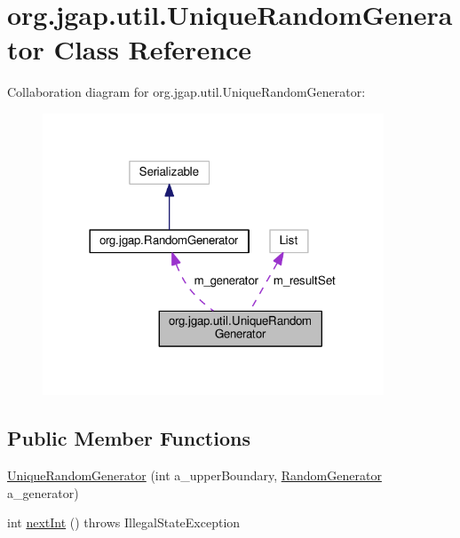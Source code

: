 \hypertarget{classorg_1_1jgap_1_1util_1_1_unique_random_generator}{\section{org.\-jgap.\-util.\-Unique\-Random\-Generator Class Reference}
\label{classorg_1_1jgap_1_1util_1_1_unique_random_generator}
}


Collaboration diagram for org.\-jgap.\-util.\-Unique\-Random\-Generator\-:
\nopagebreak
\begin{figure}[H]
\begin{center}
\leavevmode
\includegraphics[width=288pt]{classorg_1_1jgap_1_1util_1_1_unique_random_generator__coll__graph}
\end{center}
\end{figure}
\subsection*{Public Member Functions}
\begin{DoxyCompactItemize}
\item 
\hyperlink{classorg_1_1jgap_1_1util_1_1_unique_random_generator_a7fe703ee0a40a9bb2ed52ef7880c22b9}{Unique\-Random\-Generator} (int a\-\_\-upper\-Boundary, \hyperlink{interfaceorg_1_1jgap_1_1_random_generator}{Random\-Generator} a\-\_\-generator)
\item 
int \hyperlink{classorg_1_1jgap_1_1util_1_1_unique_random_generator_afb07164ecbe2d49464f925f7edc54ef7}{next\-Int} ()  throws Illegal\-State\-Exception 
\end{DoxyCompactItemize}
